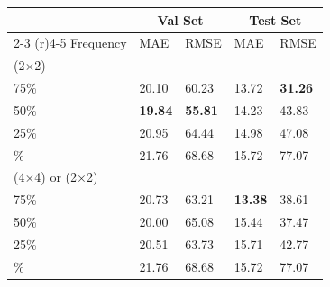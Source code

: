 \begin{tabular}{lllll}
\toprule
  & \multicolumn{2}{c}{Val Set} & \multicolumn{2}{c}{Test Set} \\
  \cmidrule(r){2-3} \cmidrule(r){4-5}
 Frequency & MAE & RMSE & MAE & RMSE
 \\
 \midrule
 \multicolumn{5}{l}{(2$\times$2)} \\
75\% & 20.10 & 60.23 & 13.72 & \textbf{31.26} \\
50\% & \textbf{19.84}  & \textbf{55.81} & 14.23  & 43.83 \\
25\% & 20.95 & 64.44 & 14.98 & 47.08 \\
\; 0\% & 21.76 & 68.68 & 15.72 & 77.07 \\
\multicolumn{5}{l}{(4$\times$4) or (2$\times$2)} \\
75\% & 20.73 & 63.21 & \textbf{13.38} & 38.61\\
50\% & 20.00 & 65.08 & 15.44 & 37.47 \\
25\% & 20.51 & 63.73 & 15.71 & 42.77\\
\; 0\% & 21.76 & 68.68 & 15.72 & 77.07\\
\bottomrule
\end{tabular}

 




